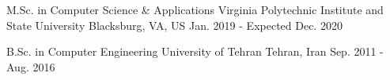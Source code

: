 \begin{cventries}
  \cventryshort
    {M.Sc. in Computer Science \& Applications} %
    {Virginia Polytechnic Institute and State University} %
    {Blacksburg, VA, US} %
    {Jan. 2019 - Expected Dec. 2020} %

  \cventryshort
    {B.Sc. in Computer Engineering} %
    {University of Tehran} %
    {Tehran, Iran} %
    {Sep. 2011 - Aug. 2016} %
\end{cventries}
